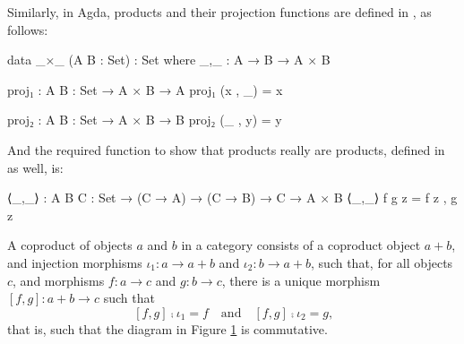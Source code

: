\begin{example}
  \label{ex:product-agda}

  Similarly, in Agda, products and their projection functions are
  defined in , as follows:
  \begin{codeagda}
data _×_ (A B : Set) : Set where
  _,_ : A → B → A × B

proj₁ : {A B : Set} → A × B → A
proj₁ (x , _) = x

proj₂ : {A B : Set} → A × B → B
proj₂ (_ , y) = y
  \end{codeagda}
  And the required function to show that products really are products,
  defined in  as well, is:
  \begin{codeagda}
⟨_,_⟩ : {A B C : Set} → (C → A) → (C → B) → C → A × B
⟨_,_⟩ f g z = f z , g z
  \end{codeagda}

\end{example}

\begin{definition}
  \label{def:coproduct}


  A coproduct of objects $a$ and $b$ in a category  consists of
  a coproduct object $a + b$, and injection morphisms $\iota_{1}: a
  \to a + b$ and $\iota_{2}: b \to a + b$, such that, for all objects
  $c$, and morphisms $f: a \to c$ and $g: b \to c$, there is a unique
  morphism $[f,g]: a + b \to c$ such that
  \begin{equation}
    \label{eq:coproduct}
    [f,g] \comp \iota_{1} = f
    \quad
    \text{and}
    \quad
    [f,g] \comp \iota_{2} = g
    \text{,}
  \end{equation}
  that is, such that the diagram in Figure \ref{fig:coproduct} is
  commutative.

  \begin{figure}[htb]
    \begin{center}
    \end{center}
    \caption{}
    \label{fig:coproduct}
  \end{figure}

\end{definition}

